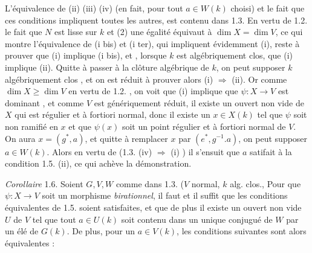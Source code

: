 \documentclass[11pt,a4paper]{article}
\begin{document}
L'équivalence de (ii) (iii) (iv) (en fait, pour tout $a \in W(k)$ choisi) et
le fait que ces conditions impliquent toutes les autres, est contenu dans
1.3. En vertu de 1.2. le fait que $N$ est lisse sur $k$ et (2) une égalité
équivaut à $\dim X = \dim V$, ce qui montre l'équivalence de (i bis) et (i
ter), qui impliquent évidemment (i), reste à prouver que (i) implique (i
bis), et , lorsque $k$ est algébriquement clos, que (i) implique (ii). Quitte
à passer à la clôture algébrique de $k$, on peut supposer $k$
algébriquement clos , et on est réduit à prouver alors (i) $\Rightarrow$
(ii). Or comme $\dim X \geqslant \dim V$ en vertu de 1.2. , on voit que (i)
implique que $\psi : X \to V$ est dominant , et comme $V$ est génériquement
réduit, il existe un ouvert non vide de $X$ qui est régulier et à fortiori
normal, donc il existe un $x \in X(k)$ tel que $\psi$ soit non ramifié en
$x$ et que $\psi(x)$ soit un point  régulier et
à fortiori normal de $V$. On aura $x = (g^{*}, a)$, et quitte à remplacer $x$ par $(e^{*},
g^{-1}.a)$, on peut supposer $a \in W(k)$. Alors en vertu de (1.3. (iv)
$\Rightarrow$ (i) ) il s'ensuit que $a$ satifait à la condition 1.5.
(ii), ce qui achève la démonstration.

\emph{Corollaire} 1.6. Soient $G, V, W$ comme dans 1.3. ($V$ normal,
$k$ alg. clos., \struck{\ill{}} Pour que $\psi : X \to V$ soit un
morphisme \emph{birationnel}, il faut et il suffit que les conditions
équivalentes de 1.5. soient satisfaites, et que de plus il existe un ouvert
non vide $U$ de $V$ tel que tout $a \in U(k)$ soit contenu dans un unique
conjugué de $W$ par un élé de $G(k)$. De plus, pour un
$a \in V(k)$, les conditions suivantes sont alors équivalentes :
\end{document}
